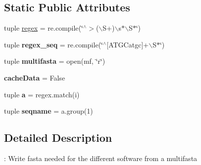 \subsection*{\-Static \-Public \-Attributes}
\begin{DoxyCompactItemize}
\item 
tuple \hyperlink{classMycarn_1_1Fasta_1_1Fasta_a6d7f580bbb67f257d70b1628a80c6cab}{regex} = re.\-compile(\char`\"{}$^\wedge$$>$($\backslash$\-S+)$\backslash$s$\ast$$\backslash$\-S$\ast$\char`\"{})
\item 
\hypertarget{classMycarn_1_1Fasta_1_1Fasta_a6cf1f75123c4f4759bf7e968c1a9fdd3}{
tuple {\bfseries regex\-\_\-seq} = re.\-compile(\char`\"{}$^\wedge$\mbox{[}\-A\-T\-G\-Catgc\mbox{]}+$\backslash$\-S$\ast$\char`\"{})}
\label{classMycarn_1_1Fasta_1_1Fasta_a6cf1f75123c4f4759bf7e968c1a9fdd3}

\item 
\hypertarget{classMycarn_1_1Fasta_1_1Fasta_ac91375f2b3d328097188f987f06e751f}{
tuple {\bfseries multifasta} = open(mf, \char`\"{}r\char`\"{})}
\label{classMycarn_1_1Fasta_1_1Fasta_ac91375f2b3d328097188f987f06e751f}

\item 
\hypertarget{classMycarn_1_1Fasta_1_1Fasta_abbbf460493c167217f0896618c85dd15}{
{\bfseries cache\-Data} = \-False}
\label{classMycarn_1_1Fasta_1_1Fasta_abbbf460493c167217f0896618c85dd15}

\item 
\hypertarget{classMycarn_1_1Fasta_1_1Fasta_aecd71dafa2e63a4e32b3c0b3648ba63d}{
tuple {\bfseries a} = regex.\-match(i)}
\label{classMycarn_1_1Fasta_1_1Fasta_aecd71dafa2e63a4e32b3c0b3648ba63d}

\item 
\hypertarget{classMycarn_1_1Fasta_1_1Fasta_ab0e8fbe65a0e89de27c5200cfb331823}{
tuple {\bfseries seqname} = a.\-group(1)}
\label{classMycarn_1_1Fasta_1_1Fasta_ab0e8fbe65a0e89de27c5200cfb331823}

\end{DoxyCompactItemize}


\subsection{\-Detailed \-Description}
\-: \-Write fasta needed for the different software from a multifasta 


